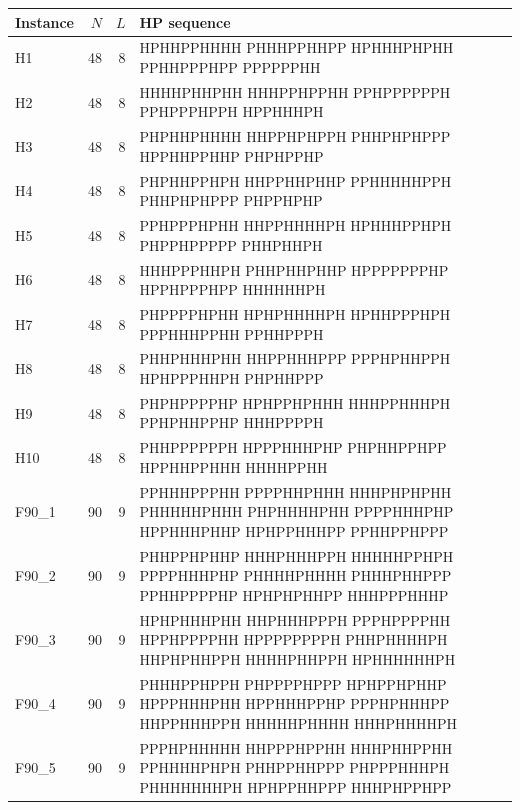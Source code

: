 \begin{center}
\label{tab:sequences}
\begin{tabular}{@{}lrr>{\raggedright\arraybackslash}p{}@{}}
\toprule Instance & $N$ & $L$ & HP sequence \\ \midrule
H1 & 48 & 8 & {\ttfamily\footnotesize HPHHPPHHHH PHHHPPHHPP HPHHHPHPHH PPHHPPPHPP PPPPPPHH} \\[3pt]
H2 & 48 & 8 & {\ttfamily\footnotesize HHHHPHHPHH HHHPPHPPHH PPHPPPPPPH PPHPPPHPPH HPPHHHPH} \\[3pt]
H3 & 48 & 8 & {\ttfamily\footnotesize PHPHHPHHHH HHPPHPHPPH PHHPHPHPPP HPPHHPPHHP PHPHPPHP} \\[3pt]
H4 & 48 & 8 & {\ttfamily\footnotesize PHPHHPPHPH HHPPHHPHHP PPHHHHHPPH PHHPHPHPPP PHPPHPHP} \\[3pt]
H5 & 48 & 8 & {\ttfamily\footnotesize PPHPPPHPHH HHPPHHHHPH HPHHHPPHPH PHPPHPPPPP PHHPHHPH} \\[3pt]
H6 & 48 & 8 & {\ttfamily\footnotesize HHHPPPHHPH PHHPHHPHHP HPPPPPPPHP HPPHPPPHPP HHHHHHPH} \\[3pt]
H7 & 48 & 8 & {\ttfamily\footnotesize PHPPPPHPHH HPHPHHHHPH HPHHPPPHPH PPPHHHPPHH PPHHPPPH} \\[3pt]
H8 & 48 & 8 & {\ttfamily\footnotesize PHHPHHHPHH HHPPHHHPPP PPPHPHHPPH HPHPPPHHPH PHPHHPPP} \\[3pt]
H9 & 48 & 8 & {\ttfamily\footnotesize PHPHPPPPHP HPHPPHPHHH HHHPPHHHPH PPHPHHPPHP HHHPPPPH} \\[3pt]
H10 & 48 & 8 & {\ttfamily\footnotesize PHHPPPPPPH HPPPHHHPHP PHPHHPPHPP HPPHHPPHHH HHHHPPHH} \\[3pt]
F90\_1 & 90 & 9 & {\ttfamily\footnotesize PPHHHPPPHH PPPPHHPHHH HHHPHPHPHH PHHHHHPHHH PHPHHHHPHH PPPPHHHPHP HPPHHHPHHP HPHPPHHHPP PPHHPPHPPP} \\[3pt]
F90\_2 & 90 & 9 & {\ttfamily\footnotesize PHHPPHPHHP HHHPHHHPPH HHHHHPPHPH PPPPHHHPHP PHHHHPHHHH PHHHPHHPPP PPHHPPPPHP HPHPHPHHPP HHHPPPHHHP} \\[3pt]
F90\_3 & 90 & 9 & {\ttfamily\footnotesize HPHPHHHPHH HHPHHHPPPH PPPHPPPPHH HPPHPPPPHH HPPPPPPPPH PHHPHHHHPH HHPHPHHPPH HHHHPHHPPH HPHHHHHHPH} \\[3pt]
F90\_4 & 90 & 9 & {\ttfamily\footnotesize PHHHPPHPPH PHPPPPHPPP HPHPPHPHHP HPPPHHHPHH HPPHHHPPHP PPPHPHHHPP HHPPHHHPPH HHHHHPHHHH HHHPHHHHPH} \\[3pt]
F90\_5 & 90 & 9 & {\ttfamily\footnotesize PPPHPHHHHH HHPPPHPPHH HHHPHHPPHH PPHHHHPHPH PHHPPHHPPP PHPPPHHHPH PHHHHHHHPH HPHPPHHPPP HHHPHPPHPP} \\[3pt]
\bottomrule
\end{tabular}
\end{center}
